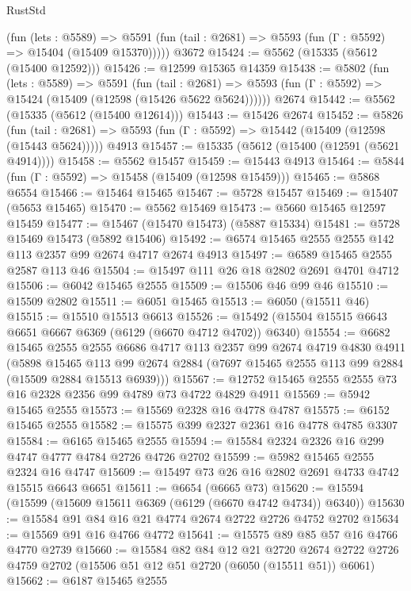 \begin{lexlean}{RustStd}
\begin{coremodule}
      (fun (lets : @5589) =>
      @5591 (fun (tail : @2681) => @5593 (fun (Γ : @5592) => @15404 (@15409 @15370)))))
    @3672
@15424 := @5562 (@15335 (@5612 (@15400 @12592)))
@15426 := @12599 @15365 @14359
@15438 := @5802
    (fun (lets : @5589) =>
    @5591
      (fun (tail : @2681) =>
      @5593 (fun (Γ : @5592) => @15424 (@15409 (@12598 (@15426 @5622 @5624))))))
    @2674
@15442 := @5562 (@15335 (@5612 (@15400 @12614)))
@15443 := @15426 @2674
@15452 := @5826
    (fun (tail : @2681) => @5593 (fun (Γ : @5592) => @15442 (@15409 (@12598 (@15443 @5624)))))
    @4913
@15457 := @15335 (@5612 (@15400 (@12591 (@5621 @4914))))
@15458 := @5562 @15457
@15459 := @15443 @4913
@15464 := @5844 (fun (Γ : @5592) => @15458 (@15409 (@12598 @15459)))
@15465 := @5868 @6554
@15466 := @15464 @15465
@15467 := @5728 @15457
@15469 := @15407 (@5653 @15465)
@15470 := @5562 @15469
@15473 := @5660 @15465 @12597 @15459
@15477 := @15467 (@15470 @15473) (@5887 @15334)
@15481 := @5728 @15469 @15473 (@5892 @15406)
@15492 := @6574 @15465 @2555 @2555 @142 @113 @2357 @99 @2674 @4717 @2674 @4913
@15497 := @6589 @15465 @2555 @2587 @113 @46
@15504 := @15497 @111 @26 @18 @2802 @2691 @4701 @4712
@15506 := @6042 @15465 @2555
@15509 := @15506 @46 @99 @46
@15510 := @15509 @2802
@15511 := @6051 @15465
@15513 := @6050 (@15511 @46)
@15515 := @15510 @15513 @6613
@15526 := @15492 (@15504 @15515 @6643 @6651 @6667 @6369 (@6129 (@6670 @4712 @4702)) @6340)
@15554 := @6682
    @15465
    @2555
    @2555
    @6686
    @4717
    @113
    @2357
    @99
    @2674
    @4719
    @4830
    @4911
    (@5898
      @15465
      @113
      @99
      @2674
      @2884
      (@7697 @15465 @2555 @113 @99 @2884 (@15509 @2884 @15513 @6939)))
@15567 := @12752 @15465 @2555 @2555 @73 @16 @2328 @2356 @99 @4789 @73 @4722 @4829 @4911
@15569 := @5942 @15465 @2555
@15573 := @15569 @2328 @16 @4778 @4787
@15575 := @6152 @15465 @2555
@15582 := @15575 @399 @2327 @2361 @16 @4778 @4785 @3307
@15584 := @6165 @15465 @2555
@15594 := @15584 @2324 @2326 @16 @299 @4747 @4777 @4784 @2726 @4726 @2702
@15599 := @5982 @15465 @2555 @2324 @16 @4747
@15609 := @15497 @73 @26 @16 @2802 @2691 @4733 @4742 @15515 @6643 @6651
@15611 := @6654 (@6665 @73)
@15620 := @15594 (@15599 (@15609 @15611 @6369 (@6129 (@6670 @4742 @4734)) @6340))
@15630 := @15584 @91 @84 @16 @21 @4774 @2674 @2722 @2726 @4752 @2702
@15634 := @15569 @91 @16 @4766 @4772
@15641 := @15575 @89 @85 @57 @16 @4766 @4770 @2739
@15660 := @15584
    @82
    @84
    @12
    @21
    @2720
    @2674
    @2722
    @2726
    @4759
    @2702
    (@15506 @51 @12 @51 @2720 (@6050 (@15511 @51)) @6061)
@15662 := @6187 @15465 @2555

\end{coremodule}
\end{lexlean}
